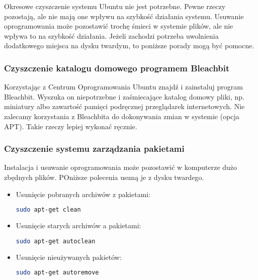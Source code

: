 Okresowe czyszczenie systemu Ubuntu nie jest potrzebne. Pewne rzeczy pozostają, ale nie mają one wpływu na szybkość działania systemu. Usuwanie oprogramowania może pozostawić trochę śmieci w systemie plików, ale nie wpływa to na szybkość działania. Jeżeli zachodzi potrzeba uwolnienia dodatkowego miejsca na dysku twardym, to poniższe porady mogą być pomocne.

\subsubsection{Czyszczenie katalogu domowego programem Bleachbit}
Korzystając z Centrum Oprogramowania Ubuntu znajdź i zainstaluj program \textcolor{ubuntu_orange}{Bleachbit}. Wyszuka on niepotrzebne i zaśmiecające katalog domowy pliki, np. miniatury albo zawartość pamięci podręcznej przeglądarek internetowych. Nie zalecamy korzystania z Bleachbita do dokonywania zmian w systemie (opcja APT). Takie rzeczy lepiej wykonać ręcznie.

\subsubsection{Czyszczenie systemu zarządzania pakietami}
Instalacja i usuwanie oprogramowania może pozostawić w komputerze dużo zbędnych plików. POniższe polecenia usuną je z dysku twardego.
\begin{itemize}
\item Usunięcie pobranych archiwów z pakietami:
\begin{lstlisting}[language=bash]
sudo apt-get clean
\end{lstlisting}
\item Usunięcie starych archiwów a pakietami:
\begin{lstlisting}[language=bash]
sudo apt-get autoclean
\end{lstlisting}
\item Usunięcie nieużywanych pakietów:
\begin{lstlisting}[language=bash]
sudo apt-get autoremove
\end{lstlisting}
\end{itemize}

